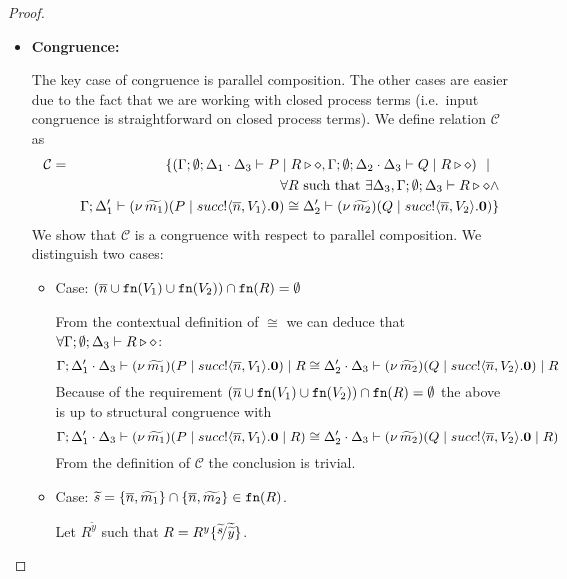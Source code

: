 \begin{proof}
\begin{itemize}
		\item	{\bf Congruence:}

				The key case of congruence is parallel composition.
				The other cases are easier due to the fact that we are
				working with closed process terms (i.e.~input congruence is straightforward
				on closed process terms).
				We define relation $\mathcal{C}$ as
				\begin{eqnarray*}
					\mathcal{C} &=&
					\{	(\Gamma; \emptyset; \Delta_1 \cdot \Delta_3 \vdash P \;|\; R \triangleright \diamond,
							\Gamma; \emptyset; \Delta_2 \cdot \Delta_3 \vdash Q \;|\; R \triangleright \diamond) \ \ |\ \ 
					\\
					& &	\forall R \textrm{ such that } \exists \Delta_3, \Gamma;\emptyset; \Delta_3 \vdash R \triangleright \diamond \land\\
					& &	\Gamma; \Delta_1' \vdash (\nu\, \widetilde{m_1})(P \;|\; succ ! \langle \overline{n}, V_1 \rangle . \mathbf{0}) \cong \Delta_2' \vdash (\nu\, \widetilde{m_2})(Q \;|\; succ ! \langle \overline{n}, V_2 \rangle . \mathbf{0})\}
				\end{eqnarray*}
				We show that $\mathcal{C}$ is a congruence with respect to parallel composition.
				We distinguish two cases:
				\begin{itemize}
					\item	Case: $(\overline{n} \cup \mathtt{fn}(V_1) \cup \mathtt{fn}(V_2)) \cap \mathtt{fn}(R) = \emptyset$

							From the contextual definition of $\cong$ we can deduce that
							$\forall \Gamma; \emptyset; \Delta_3 \vdash R \triangleright \diamond$:
							\[
								\Gamma; \Delta_1' \cdot \Delta_3 \vdash (\nu\, \widetilde{m_1})(P \;|\; succ ! \langle \overline{n}, V_1 \rangle . \mathbf{0}) \;|\; R \cong \Delta_2' \cdot \Delta_3 \vdash (\nu\, \widetilde{m_2})(Q \;|\; succ ! \langle \overline{n}, V_2 \rangle . \mathbf{0}) \;|\; R
							\]
							Because of the requirement
							$(\overline{n} \cup \mathtt{fn}(V_1) \cup \mathtt{fn}(V_2)) \cap \mathtt{fn}(R) = \emptyset$
							the above is up to structural congruence with
							\[
								\Gamma; \Delta_1' \cdot \Delta_3 \vdash (\nu\, \widetilde{m_1})(P \;|\; succ ! \langle \overline{n}, V_1 \rangle . \mathbf{0} \;|\; R) \cong \Delta_2' \cdot \Delta_3 \vdash (\nu\, \widetilde{m_2})(Q \;|\; succ ! \langle \overline{n}, V_2 \rangle . \mathbf{0} \;|\; R)
							\]
							From the definition of $\mathcal{C}$ the conclusion is trivial.

					\item	Case: $\widetilde{s} = \{\overline{n}, \widetilde{m_1}\} \cap \{\overline{n}, \widetilde{m_2}\} \in \mathtt{fn}(R)$.

							Let $R^{\widetilde{y}}$ such that $R = R^{y}\subst{\widetilde{s}}{\widetilde{\widetilde{y}}}$.



\end{itemize}
\end{itemize}
\end{proof}
